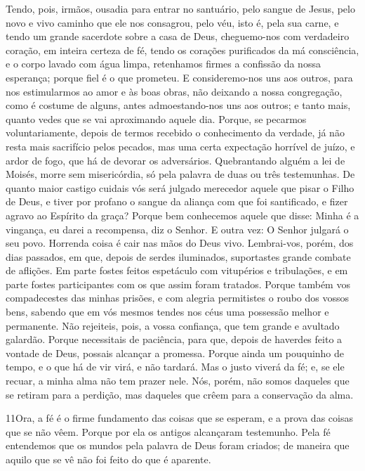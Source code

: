 Tendo, pois, irmãos, ousadia para entrar no santuário, pelo
sangue de Jesus, pelo novo e vivo caminho que ele nos
consagrou, pelo véu, isto é, pela sua carne, e tendo um
grande sacerdote sobre a casa de Deus, cheguemo-nos com
verdadeiro coração, em inteira certeza de fé, tendo os corações
purificados da má consciência, e o corpo lavado com água limpa,
retenhamos firmes a confissão da nossa esperança; porque fiel
é o que prometeu. E consideremo-nos uns aos outros, para nos
estimularmos ao amor e às boas obras, não deixando a nossa
congregação, como é costume de alguns, antes admoestando-nos uns aos
outros; e tanto mais, quanto vedes que se vai aproximando aquele
dia. Porque, se pecarmos voluntariamente, depois de termos
recebido o conhecimento da verdade, já não resta mais sacrifício
pelos pecados, mas uma certa expectação horrível de juízo, e
ardor de fogo, que há de devorar os adversários. Quebrantando
alguém a lei de Moisés, morre sem misericórdia, só pela palavra de
duas ou três testemunhas. De quanto maior castigo cuidais vós
será julgado merecedor aquele que pisar o Filho de Deus, e tiver por
profano o sangue da aliança com que foi santificado, e fizer agravo
ao Espírito da graça? Porque bem conhecemos aquele que disse:
Minha é a vingança, eu darei a recompensa, diz o Senhor. E outra
vez: O Senhor julgará o seu povo. Horrenda coisa é cair nas
mãos do Deus vivo. Lembrai-vos, porém, dos dias passados, em
que, depois de serdes iluminados, suportastes grande combate de
aflições. Em parte fostes feitos espetáculo com vitupérios e
tribulações, e em parte fostes participantes com os que assim foram
tratados. Porque também vos compadecestes das minhas prisões,
e com alegria permitistes o roubo dos vossos bens, sabendo que em
vós mesmos tendes nos céus uma possessão melhor e permanente.
Não rejeiteis, pois, a vossa confiança, que tem grande e
avultado galardão. Porque necessitais de paciência, para que,
depois de haverdes feito a vontade de Deus, possais alcançar a
promessa. Porque ainda um pouquinho de tempo, e o que há de
vir virá, e não tardará. Mas o justo viverá da fé; e, se ele
recuar, a minha alma não tem prazer nele. Nós, porém, não
somos daqueles que se retiram para a perdição, mas daqueles que
crêem para a conservação da alma.

\medskip

\lettrine{11} Ora, a fé é o firme fundamento das coisas que se
esperam, e a prova das coisas que se não vêem. Porque por ela os
antigos alcançaram testemunho. Pela fé entendemos que os mundos
pela palavra de Deus foram criados; de maneira que aquilo que se vê
não foi feito do que é aparente.

